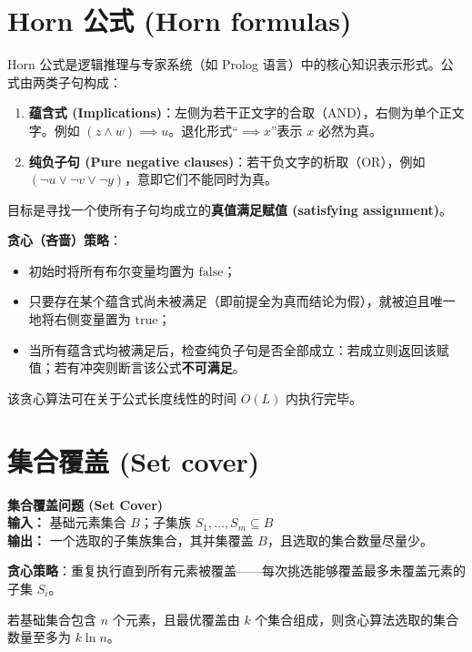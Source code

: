 \section{Horn 公式 (Horn formulas)}

Horn 公式是逻辑推理与专家系统（如 Prolog 语言）中的核心知识表示形式。公式由两类子句构成：
\begin{enumerate}
    \item \textbf{蕴含式 (Implications)}：左侧为若干正文字的合取（AND），右侧为单个正文字。例如 $(z \land w) \implies u$。退化形式“$\implies x$”表示 $x$ 必然为真。
    \item \textbf{纯负子句 (Pure negative clauses)}：若干负文字的析取（OR），例如 $(\neg u \lor \neg v \lor \neg y)$，意即它们不能同时为真。
\end{enumerate}

目标是寻找一个使所有子句均成立的\textbf{真值满足赋值 (satisfying assignment)}。

\textbf{贪心（吝啬）策略}：
\begin{itemize}
    \item 初始时将所有布尔变量均置为 $\text{false}$；
    \item 只要存在某个蕴含式尚未被满足（即前提全为真而结论为假），就被迫且唯一地将右侧变量置为 $\text{true}$；
    \item 当所有蕴含式均被满足后，检查纯负子句是否全部成立：若成立则返回该赋值；若有冲突则断言该公式\textbf{不可满足}。
\end{itemize}
该贪心算法可在关于公式长度线性的时间 $O(L)$ 内执行完毕。

\section{集合覆盖 (Set cover)}

\begin{tcolorbox}[colback=white,colframe=gray!50!black]
\textbf{集合覆盖问题 (Set Cover)} \\
\textbf{输入：} 基础元素集合 $B$；子集族 $S_1, \dots, S_m \subseteq B$ \\
\textbf{输出：} 一个选取的子集族集合，其并集覆盖 $B$，且选取的集合数量尽量少。
\end{tcolorbox}

\textbf{贪心策略}：重复执行直到所有元素被覆盖——每次挑选能够覆盖最多未覆盖元素的子集 $S_i$。

\begin{claim}
若基础集合包含 $n$ 个元素，且最优覆盖由 $k$ 个集合组成，则贪心算法选取的集合数量至多为 $k \ln n$。
\end{claim}

